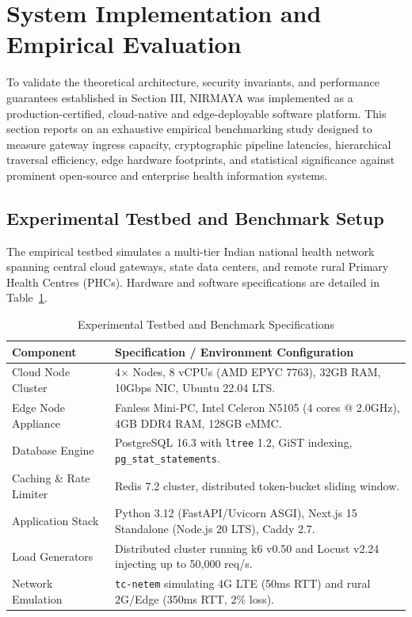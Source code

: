 \documentclass[journal,twocolumn]{IEEEtran}
\begin{document}
\section{System Implementation and Empirical Evaluation}
\label{sec:empirical_eval}

To validate the theoretical architecture, security invariants, and performance guarantees established in Section III, NIRMAYA was implemented as a production-certified, cloud-native and edge-deployable software platform. This section reports on an exhaustive empirical benchmarking study designed to measure gateway ingress capacity, cryptographic pipeline latencies, hierarchical traversal efficiency, edge hardware footprints, and statistical significance against prominent open-source and enterprise health information systems.

\subsection{Experimental Testbed and Benchmark Setup}
The empirical testbed simulates a multi-tier Indian national health network spanning central cloud gateways, state data centers, and remote rural Primary Health Centres (PHCs). Hardware and software specifications are detailed in Table~\ref{tab:testbed_specs}.

\begin{table}[t]
\caption{Experimental Testbed and Benchmark Specifications}
\label{tab:testbed_specs}
\centering
\small
\begin{tabularx}{\columnwidth}{lX}
\toprule
\textbf{Component} & \textbf{Specification / Environment Configuration} \\
\midrule
Cloud Node Cluster & 4$\times$ Nodes, 8 vCPUs (AMD EPYC 7763), 32GB RAM, 10Gbps NIC, Ubuntu 22.04 LTS. \\
Edge Node Appliance & Fanless Mini-PC, Intel Celeron N5105 (4 cores @ 2.0GHz), 4GB DDR4 RAM, 128GB eMMC. \\
Database Engine & PostgreSQL 16.3 with \texttt{ltree} 1.2, GiST indexing, \texttt{pg\_stat\_statements}. \\
Caching \& Rate Limiter & Redis 7.2 cluster, distributed token-bucket sliding window. \\
Application Stack & Python 3.12 (FastAPI/Uvicorn ASGI), Next.js 15 Standalone (Node.js 20 LTS), Caddy 2.7. \\
Load Generators & Distributed cluster running k6 v0.50 and Locust v2.24 injecting up to 50,000 req/s. \\
Network Emulation & \texttt{tc-netem} simulating 4G LTE (50ms RTT) and rural 2G/Edge (350ms RTT, 2\% loss). \\
\bottomrule
\end{tabularx}
\end{table}
\end{document}
